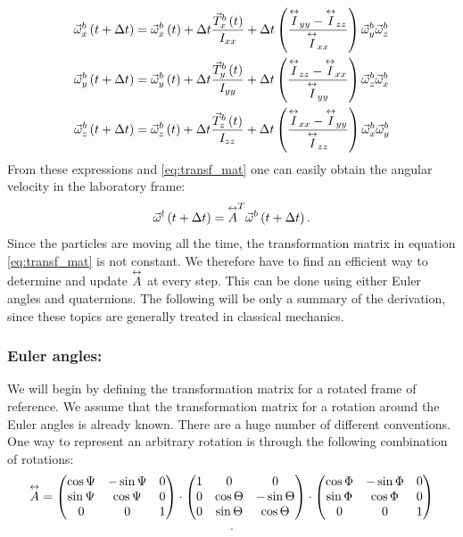 \begin{align}
\vec{\omega}^b_x \left(t+\Delta t\right)  &= \vec{\omega}^b_x \left(t\right) + 
\Delta t \frac  {\vec{T}^b_x \left(t\right) }{I_{xx}} + \Delta t \left(\frac{\overset{\leftrightarrow}{I}_{yy}-\overset{\leftrightarrow}{I}_{zz}}{\overset{\leftrightarrow}{I}_{xx}}   \right) \vec{\omega}^b_y\vec{\omega}^b_z \\
\vec{\omega}^b_y \left(t+\Delta t\right) &= \vec{\omega}^b_y \left(t\right) + 
\Delta t \frac  {\vec{T}^b_y \left(t\right) }{I_{yy}} + \Delta t \left(\frac{\overset{\leftrightarrow}{I}_{zz}-\overset{\leftrightarrow}{I}_{xx}}{\overset{\leftrightarrow}{I}_{yy}}   \right) \vec{\omega}^b_z\vec{\omega}^b_x \\
\vec{\omega}^b_z \left(t+\Delta t\right) &= \vec{\omega}^b_z \left(t\right) + 
\Delta t \frac  {\vec{T}^b_z \left(t\right) }{I_{zz}} + \Delta t \left(\frac{\overset{\leftrightarrow}{I}_{xx}-\overset{\leftrightarrow}{I}_{yy}}{\overset{\leftrightarrow}{I}_{zz}}   \right) \vec{\omega}^b_x\vec{\omega}^b_y
\end{align}
From these expressions  and \eqref{eq:transf_mat}  one can easily obtain the angular velocity in the laboratory frame:
$$
\vec{\omega}^l \left(t+\Delta t\right) = \overset{\leftrightarrow}{A}^T \vec{\omega}^b\left(t+\Delta t\right).
$$
Since the particles are moving all the time, the transformation matrix in equation \eqref{eq:transf_mat} is not constant. We therefore have to find an efficient way to determine and update $\overset{\leftrightarrow}{A}$ at every step. This can be done using either Euler angles and quaternions. The following will be only a summary of the derivation, since these topics are generally treated in classical mechanics.



\subsubsection*{Euler angles:}
We will begin by defining the transformation matrix for a rotated frame of reference. We assume that the transformation matrix for a rotation around the Euler angles is already known. There are a huge number of different conventions. One way to represent an arbitrary rotation is through the following combination of rotations:
$$
\overset{\leftrightarrow}{A} = 
\begin{pmatrix}
 \cos{\Psi}  & -\sin{\Psi} & 0 \\
 \sin{\Psi} & \cos{\Psi} &0\\
 0 & 0 & 1   
\end{pmatrix} 
\cdot
\begin{pmatrix}
 1 & 0 & 0 \\
0 & \cos{\Theta} & -\sin{\Theta} \\
 0 & \sin{\Theta} & \cos{\Theta}  
 \end{pmatrix} 
\cdot
\begin{pmatrix}
 \cos{\Phi} & -\sin{\Phi} & 0  \\
 \sin{\Phi} & \cos{\Phi}  & 0  \\
 0 & 0 & 1  
\end{pmatrix} 
$$
\begin{equation}
.
 \label{eq:horr_mat}
\end{equation}

